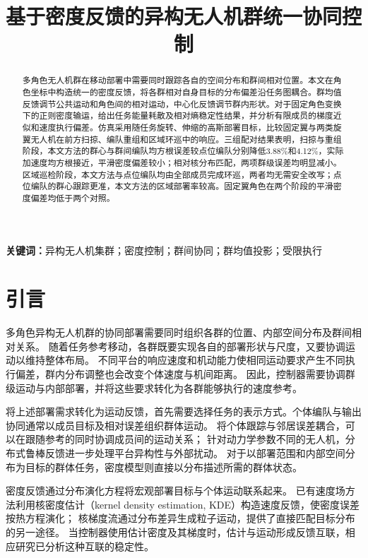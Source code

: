 \documentclass[UTF8,a4paper,11pt,fontset=none]{ctexart}
\title{\bfseries\color{ink}基于密度反馈的异构无人机群统一协同控制}
\author{}\date{}
\begin{document}
\maketitle\vspace{-2em}
\begin{abstract}
多角色无人机群在移动部署中需要同时跟踪各自的空间分布和群间相对位置。本文在角色坐标中构造统一的密度反馈，将各群相对自身目标的分布偏差沿任务图耦合。群均值反馈调节公共运动和角色间的相对运动，中心化反馈调节群内形状。对于固定角色变换下的正则密度输运，给出任务能量耗散及相对熵稳定性结果，并分析有限成员的梯度近似和速度执行偏差。仿真采用随任务旋转、伸缩的高斯部署目标，比较固定翼与两类旋翼无人机在前方扫掠、编队重组和区域环巡中的响应。三组配对结果表明，扫掠与重组阶段，本文方法的群心与群间编队均方根误差较点位编队分别降低3.88\%和4.12\%，实际加速度均方根接近，平滑密度偏差较小；相对核分布匹配，两项群级误差均明显减小。区域巡检阶段，本文方法与点位编队均由全部成员完成环巡，两者均无需安全改写；点位编队的群心跟踪更准，本文方法的区域部署率较高。固定翼角色在两个阶段的平滑密度偏差均低于两个对照。

\end{abstract}
\noindent\textbf{关键词：}异构无人机集群；密度控制；群间协同；群均值投影；受限执行

\section{引言}
多角色异构无人机群的协同部署需要同时组织各群的位置、内部空间分布及群间相对关系。
随着任务参考移动，各群既要实现各自的部署形状与尺度，又要协调运动以维持整体布局。
不同平台的响应速度和机动能力使相同运动要求产生不同执行偏差，群内分布调整也会改变个体速度与机间距离。
因此，控制器需要协调群级运动与内部部署，并将这些要求转化为各群能够执行的速度参考。

将上述部署需求转化为运动反馈，首先需要选择任务的表示方式。个体编队与输出协同通常以成员目标及相对误差组织群体运动。
将个体跟踪与邻居误差耦合，可以在跟随参考的同时协调成员间的运动关系\cite{ren2008}；
针对动力学参数不同的无人机，分布式鲁棒反馈进一步处理平台异构性与外部扰动\cite{imran2024}。
对于以部署范围和内部空间分布为目标的群体任务，密度模型则直接以分布描述所需的群体状态。

密度反馈通过分布演化方程将宏观部署目标与个体运动联系起来。
已有速度场方法利用核密度估计（kernel density estimation, KDE）构造速度反馈，使密度误差按热方程演化\cite{eren2017}；
核梯度流通过分布差异生成粒子运动，提供了直接匹配目标分布的另一途径\cite{arbel2019}。
当控制器使用估计密度及其梯度时，估计与运动形成反馈互联，相应研究已分析这种互联的稳定性\cite{zheng2022feedback}。
\end{document}
